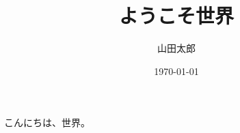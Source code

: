 \documentclass[12pt]{jreport}
\title{ようこそ世界}
\author{山田太郎}
\date{\today}
\begin{document}
\maketitle
こんにちは、世界。
\end{document}

